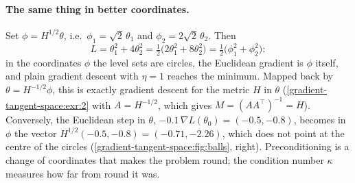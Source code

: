 \begin{notechapter}
\paragraph{The same thing in better coordinates.} Set $\phi = H^{1/2}\theta$, i.e.\ $\phi_1 = \sqrt2\,\theta_1$ and $\phi_2 = 2\sqrt2\,\theta_2$.
Then
\[
  L = \theta_1^2 + 4\theta_2^2 = \tfrac12\bigl(2\theta_1^2 + 8\theta_2^2\bigr) = \tfrac12\bigl(\phi_1^2 + \phi_2^2\bigr):
\]
in the coordinates $\phi$ the level sets are circles, the Euclidean gradient is $\phi$ itself, and plain
gradient descent with $\eta = 1$ reaches the minimum. Mapped back by $\theta = H^{-1/2}\phi$, this is exactly
gradient descent for the metric $H$ in $\theta$ (\cref{gradient-tangent-space:exr:2} with $A = H^{-1/2}$, which gives
$M = (AA^\top)^{-1} = H$). Conversely, the Euclidean step in $\theta$, $-0.1\,\nabla L(\theta_0) = (-0.5, -0.8)$, becomes in
$\phi$ the vector $H^{1/2}(-0.5, -0.8) = (-0.71, -2.26)$, which does not point at the centre of the circles
(\cref{gradient-tangent-space:fig:balls}, right). Preconditioning is a change of coordinates that makes
the problem round; the condition number $\kappa$ measures how far from round it was.


\end{notechapter}
